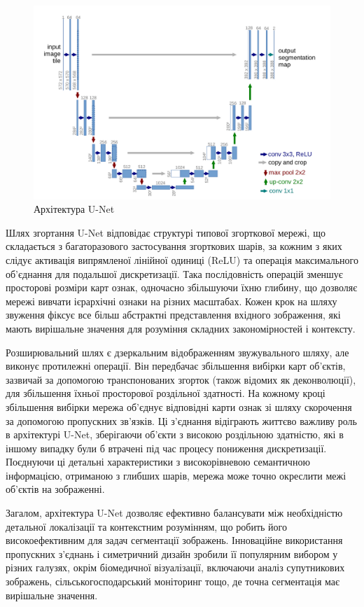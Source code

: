 \begin{figure}[ht]
    \centering
    \includegraphics[scale=0.3]{Images/unet_arch.png}
    \caption{Архітектура U-Net}
    \label{unet_arch}
\end{figure}

Шлях згортання U-Net відповідає структурі типової згорткової
мережі, що складається з багаторазового застосування
згорткових шарів, за кожним з яких слідує активація
випрямленої лінійної одиниці (ReLU) та операція
максимального об'єднання для подальшої дискретизації.
Така послідовність операцій зменшує просторові розміри
карт ознак, одночасно збільшуючи їхню глибину,
що дозволяє мережі вивчати ієрархічні ознаки на різних
масштабах. Кожен крок на шляху звуження фіксує все
більш абстрактні представлення вхідного зображення,
які мають вирішальне значення для розуміння складних
закономірностей і контексту.

Розширювальний шлях є дзеркальним відображенням звужувального
шляху, але виконує протилежні операції. Він передбачає
збільшення вибірки карт об'єктів, зазвичай за допомогою
транспонованих згорток (також відомих як деконволюції),
для збільшення їхньої просторової роздільної здатності.
На кожному кроці збільшення вибірки мережа об'єднує
відповідні карти ознак зі шляху скорочення за допомогою
пропускних зв'язків. Ці з'єднання відіграють життєво
важливу роль в архітектурі U-Net, зберігаючи об'єкти з
високою роздільною здатністю, які в іншому випадку були
б втрачені під час процесу пониження дискретизації.
Поєднуючи ці детальні характеристики з високорівневою
семантичною інформацією, отриманою з глибших шарів,
мережа може точно окреслити межі об'єктів на зображенні.

Загалом, архітектура U-Net дозволяє ефективно
балансувати між необхідністю детальної локалізації
та контекстним розумінням, що робить його високоефективним
для задач сегментації зображень. Інноваційне використання
пропускних з'єднань і симетричний дизайн зробили її
популярним вибором у різних галузях, окрім біомедичної
візуалізації, включаючи аналіз супутникових зображень,
сільськогосподарський моніторинг тощо, де точна
сегментація має вирішальне значення.

